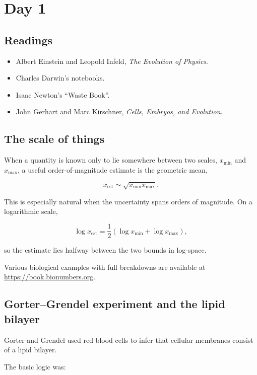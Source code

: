 
\section{Day 1}

\subsection{Readings}

\begin{itemize}
    \item Albert Einstein and Leopold Infeld,
    \textit{The Evolution of Physics}.
    \item Charles Darwin's notebooks.
    \item Isaac Newton's ``Waste Book''.
    \item John Gerhart and Marc Kirschner,
    \textit{Cells, Embryos, and Evolution}.
\end{itemize}


\subsection{The scale of things}

When a quantity is known only to lie somewhere between two scales,
$x_{\min}$ and $x_{\max}$, a useful order-of-magnitude estimate is the geometric mean,

\[
    x_{\mathrm{est}} \sim \sqrt{x_{\min}x_{\max}}.
\]

This is especially natural when the uncertainty spans orders of magnitude.
On a logarithmic scale,

\[
    \log x_{\mathrm{est}} = \frac{1}{2} \left( \log x_{\min} + \log x_{\max} \right),
\]

so the estimate lies halfway between the two bounds in log-space.

Various biological examples with full breakdowns are available at \url{https://book.bionumbers.org}.


\subsection{Gorter--Grendel experiment and the lipid bilayer}

Gorter and Grendel used red blood cells to infer that cellular membranes
consist of a lipid bilayer.

The basic logic was:

